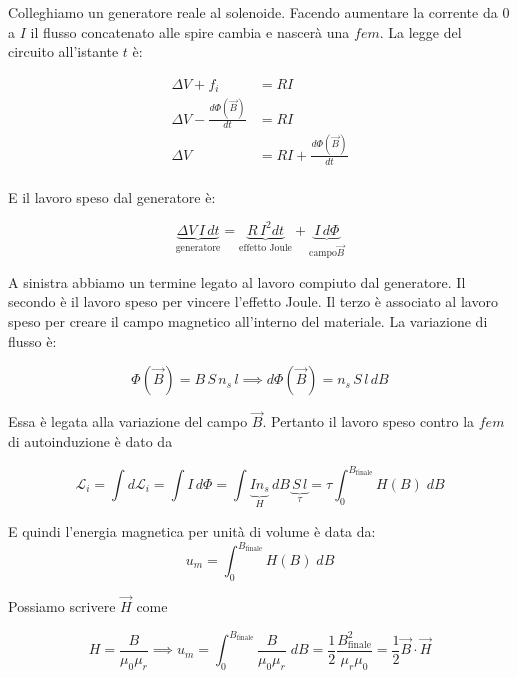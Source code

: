 \begin{figure}[htpb]
\end{figure}
\FloatBarrier

Colleghiamo un generatore reale al solenoide. Facendo aumentare la corrente da $0$ a $I$ il flusso concatenato alle spire cambia e nascerà una $fem$. La legge del circuito all'istante $t$ è:

\begin{equation*}
	\begin{aligned}
		\Delta V + f_i &= RI \\
		\Delta V - \frac{d\Phi (\vec{B})}{dt} &= RI \\
		\Delta V &= RI + \frac{d\Phi (\vec{B})}{dt} \\
	\end{aligned}
\end{equation*}

E il lavoro speso dal generatore è:

\[
	\underbrace{\Delta V\,I\,dt}_{\text{generatore}} = \underbrace{R\,I^2 dt}_{\text{effetto Joule}} + \underbrace{I\,d\Phi}_{\text{campo} \vec{B}}
\]

A sinistra abbiamo un termine legato al lavoro compiuto dal generatore. Il secondo è il lavoro speso per vincere l'effetto Joule. Il terzo è associato al lavoro speso per creare il campo magnetico all'interno del materiale. La variazione di flusso è:

\[
	\Phi (\vec{B}) = B\,S\,n_s\,l  \implies  d\Phi (\vec{B} ) = n_s\,S\,l\,dB
\]

Essa è legata alla variazione del campo $\vec{B}$. Pertanto il lavoro speso contro la $fem$ di autoinduzione è dato da

\[
	\mathcal{L}_i = \int d\mathcal{L}_i =\int I\,d\Phi = \int \underbrace{I n_s}_H\,dB\,\underbrace{S\,l}_{\tau} = \tau \int_0^{B_{\text{finale}}} H(B) \;dB
\]

E quindi l'energia magnetica per unità di volume è data da:\[
	\boxed{u_m = \int_0^{B_{\text{finale}}} H(B) \;dB}
\]

Possiamo scrivere $ \vec{H}  $ come

\[
	H = \frac{B}{\mu_0 \mu_r} \implies u_m = \int_0^{B_{\text{finale}}} \frac{B}{\mu_0 \mu_r} \;dB = \frac{1}{2} \frac{B^2_{\text{finale}}}{\mu_r \mu_0} = \frac{1}{2} \vec{B} \cdot \vec{H}
\]

